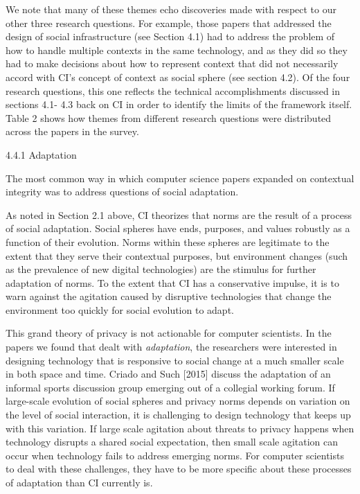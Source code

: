 \documentclass[../thesis.tex]{subfiles}
\begin{document}
\bigskip

We note that many of these themes echo discoveries made with respect to
our other three research questions. For example, those papers that
addressed the design of social infrastructure (see Section 4.1) had to
address the problem of how to handle multiple contexts in the same
technology, and as they did so they had to make decisions about how to
represent context that did not necessarily accord with
CI's concept of context as social sphere (see section
4.2). Of the four research questions, this one reflects the technical
accomplishments discussed in sections 4.1- 4.3 back on CI in order to
identify the limits of the framework itself. Table 2 shows how themes
from different research questions were distributed across the papers in
the survey.


\bigskip

{\color[rgb]{0.4,0.4,0.4}
4.4.1 Adaptation}

The most common way in which computer science papers expanded on
contextual integrity was to address questions of social adaptation.


\bigskip

As noted in Section 2.1 above, CI theorizes that norms are the result of
a process of social adaptation. Social spheres have ends, purposes, and
values robustly as a function of their evolution. Norms within these
spheres are legitimate to the extent that they serve their contextual
purposes, but environment changes (such as the prevalence of new
digital technologies) are the stimulus for further adaptation of norms.
To the extent that CI has a conservative impulse, it is to warn against
the agitation caused by disruptive technologies that change the
environment too quickly for social evolution to adapt.


\bigskip

This grand theory of privacy is not actionable for computer scientists.
In the papers we found that dealt with \textit{adaptation}, the
researchers were interested in designing technology that is responsive
to social change at a much smaller scale in both space and time. Criado
and Such [2015] discuss the adaptation of an informal sports discussion
group emerging out of a collegial working forum. If large-scale
evolution of social spheres and privacy norms depends on variation on
the level of social interaction, it is challenging to design technology
that keeps up with this variation. If large scale agitation about
threats to privacy happens when technology disrupts a shared social
expectation, then small scale agitation can occur when technology fails
to address emerging norms. For computer scientists to deal with these
challenges, they have to be more specific about these processes of
adaptation than CI currently is.
\end{document}
